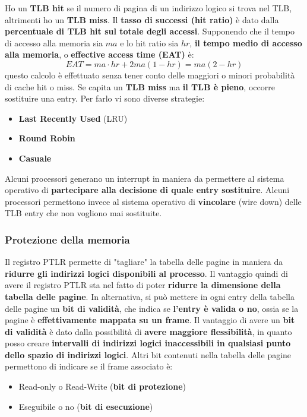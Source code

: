 \documentclass[12pt]{article}
\begin{document}
Ho un \textbf{TLB hit} se il numero di pagina di un indirizzo logico si trova nel TLB, altrimenti ho un \textbf{TLB miss}.
Il \textbf{tasso di successi (hit ratio)} è dato dalla \textbf{percentuale di TLB hit sul totale degli accessi}.
Supponendo che il tempo di accesso alla memoria sia $ma$ e lo hit ratio sia $hr$, \textbf{il tempo medio di accesso alla memoria}, o \textbf{effective access time (EAT)} è:
$$EAT = ma \cdot hr + 2 ma(1-hr) = ma(2-hr)$$
questo calcolo è effettuato senza tener conto delle maggiori o minori probabilità di cache hit o miss.
Se capita un \textbf{TLB miss} ma \textbf{il TLB è pieno}, occorre sostituire una entry.
Per farlo vi sono diverse strategie:
\begin{itemize}
    \item \textbf{Last Recently Used} (LRU)
    \item \textbf{Round Robin}
    \item \textbf{Casuale}
\end{itemize}
Alcuni processori generano un interrupt in maniera da permettere al sistema operativo di \textbf{partecipare alla decisione di quale entry sostituire}.
Alcuni processori permettono invece al sistema operativo di \textbf{vincolare} (wire down) delle TLB entry che non vogliono mai sostituite.
\subsubsection{Protezione della memoria}
Il registro PTLR permette di "tagliare" la tabella delle pagine in maniera da \textbf{ridurre gli indirizzi logici disponibili al processo}.
Il vantaggio quindi di avere il registro PTLR sta nel fatto di poter \textbf{ridurre la dimensione della tabella delle pagine}.
In alternativa, si può mettere in ogni entry della tabella delle pagine un \textbf{bit di validità}, che indica se \textbf{l'entry è valida o no}, ossia se la pagine è \textbf{effettivamente mappata su un frame}.
Il vantaggio di avere un \textbf{bit di validità} è dato dalla possibilità di \textbf{avere maggiore flessibilità}, in quanto posso creare \textbf{intervalli di indirizzi logici inaccessibili in qualsiasi punto dello spazio di indirizzi logici}.
Altri bit contenuti nella tabella delle pagine permettono di indicare se il frame associato è:
\begin{itemize}
    \item Read-only o Read-Write (\textbf{bit di protezione})
    \item Eseguibile o no (\textbf{bit di esecuzione})
\end{itemize}
\end{document}

